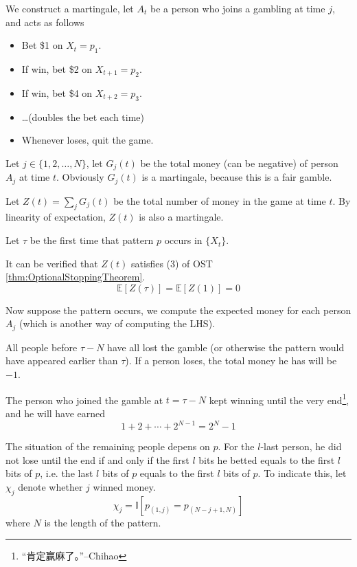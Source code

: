             We construct a martingale, let $A_t$ be a person who joins a gambling at time $j$, and acts as follows
            \begin{itemize}
                \item Bet \$1 on $X_t=p_1$.
                \item If win, bet \$2 on $X_{t+1}=p_2$.
                \item If win, bet \$4 on $X_{t+2}=p_3$.
                \item \dots (doubles the bet each time)
                \item Whenever loses, quit the game.
            \end{itemize}

            Let $j \in \{1, 2, \dots, N\}$, let $G_j(t)$ be the total money (can be negative) of person $A_j$ at time $t$. Obviously $G_j(t)$ is a martingale, because this is a fair gamble.

            Let $Z(t) = \sum_j G_j(t)$ be the total number of money in the game at time $t$. By linearity of expectation, $Z(t)$ is also a martingale.

            Let $\tau$ be the first time that pattern $p$ occurs in $\{X_t\}$.

            It can be verified that $Z(t)$ satisfies (3) of OST \ref{thm:OptionalStoppingTheorem}.
            \[ \mathbb{E}[Z(\tau)] = \mathbb{E}[Z(1)] = 0 \]

            Now suppose the pattern occurs, we compute the expected money for each person $A_j$ (which is another way of computing the LHS).

            All people before $\tau - N$ have all lost the gamble (or otherwise the pattern would have appeared earlier than $\tau$). If a person loses, the total money he has will be $-1$. 

            The person who joined the gamble at $t = \tau-N$ kept winning until the very end\footnote{“肯定赢麻了。”--Chihao}, and he will have earned
            \[ 1 + 2 + \cdots + 2^{N-1} = 2^N-1 \]

            The situation of the remaining people depens on $p$. For the $l$-last person, he did not lose until the end if and only if the first $l$ bits he betted equals to the first $l$ bits of $p$, i.e. the last $l$ bits of $p$ equals to the first $l$ bits of $p$. To indicate this, let $\chi_j$ denote whether $j$ winned money.
            \[ \chi_j = \mathbb{I}[p_{(1,j)} = p_{(N-j+1,N)}] \]
            where $N$ is the length of the pattern.

